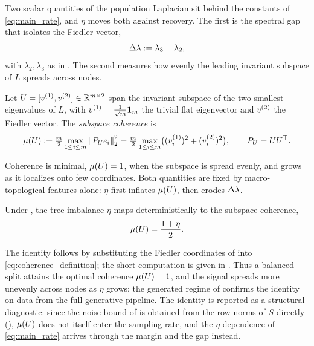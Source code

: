 Two scalar quantities of the population Laplacian sit behind the constants of
\eqref{eq:main_rate}, and $\eta$ moves both against recovery. The first is the
spectral gap that isolates the Fiedler vector,
\begin{equation}\label{eq:gap_definition}
   \Delta\lambda := \lambda_3 - \lambda_2 ,
\end{equation}
with $\lambda_2,\lambda_3$ as in . The second measures how evenly
the leading invariant subspace of $L$ spreads across nodes.

\begin{definition}\label{def:coherence}
Let $U=[v^{(1)},v^{(2)}]\in\mathbb{R}^{m\times2}$ span the invariant subspace of the two
smallest eigenvalues of $L$, with $v^{(1)}=\tfrac1{\sqrt m}\mathbf{1}_m$ the trivial flat
eigenvector and $v^{(2)}$ the Fiedler vector. The \emph{subspace coherence} is
\begin{equation}\label{eq:coherence_definition}
   \mu(U) := \tfrac{m}{2}\max_{1\le i\le m}\left\lVert P_U e_i \right\rVert_2^2
         = \tfrac{m}{2}\max_{1\le i\le m}\bigl((v_i^{(1)})^2+(v^{(2)}_i)^2\bigr),
   \qquad P_U=UU^\top.
\end{equation}
\end{definition}

\noindent Coherence is minimal, $\mu(U)=1$, when the subspace is spread evenly, and
grows as it localizes onto few coordinates. Both quantities are fixed by
 macro-topological features alone: $\eta$ first inflates $\mu(U)$, then erodes $\Delta\lambda$.

\begin{proposition}\label{prop:coherence}
Under , the tree imbalance $\eta$ maps deterministically to the
subspace coherence,
\begin{equation}\label{eq:coherence_linear_growth}
   \mu(U)=\frac{1+\eta}{2}.
\end{equation}
\end{proposition}
\noindent The identity follows by substituting the Fiedler coordinates of
 into \eqref{eq:coherence_definition}; the short computation is given in
. Thus a balanced split attains the
optimal coherence $\mu(U)=1$, and the signal spreads more unevenly across nodes as
$\eta$ grows; the generated regime of  confirms the identity
on data from the full generative pipeline. The identity is reported as a
structural diagnostic: since the noise bound of  is obtained
from the row norms of $S$ directly (), $\mu(U)$ does not itself enter
the sampling rate, and the $\eta$-dependence of \eqref{eq:main_rate} arrives
through the margin and the gap instead.


